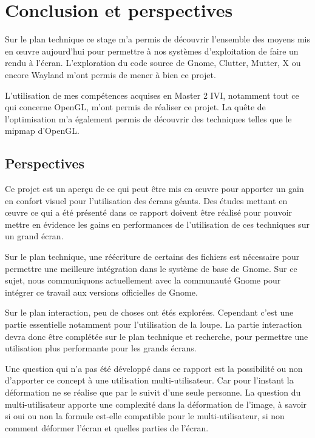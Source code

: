 \chapter{Conclusion et perspectives}

Sur le plan technique ce stage m'a permis de découvrir l'ensemble des moyens mis en œuvre aujourd'hui pour permettre à nos systèmes d'exploitation de faire un rendu à l'écran. L'exploration du code source de Gnome, Clutter, Mutter, X ou encore Wayland m'ont permis de mener à bien ce projet.

L'utilisation de mes compétences acquises en Master 2 IVI, notamment tout ce qui concerne OpenGL, m'ont permis de réaliser ce projet. La quête de l'optimisation m'a également permis de découvrir des techniques telles que le mipmap d'OpenGL.

\section*{Perspectives}

Ce projet est un aperçu de ce qui peut être mis en œuvre pour apporter un gain en confort visuel pour l'utilisation des écrans géants. Des études mettant en œuvre ce qui a été présenté dans ce rapport doivent être réalisé pour pouvoir mettre en évidence les gains en performances de l'utilisation de ces techniques sur un grand écran.

Sur le plan technique, une réécriture de certains des fichiers est nécessaire pour permettre une meilleure intégration dans le système de base de Gnome. Sur ce sujet, nous communiquons actuellement avec la communauté Gnome pour intégrer ce travail aux versions officielles de Gnome. 
	
Sur le plan interaction, peu de choses ont étés explorées. Cependant c'est une partie essentielle notamment pour l'utilisation de la loupe. La partie interaction devra donc être complétée sur le plan technique et recherche, pour permettre une utilisation plus performante pour les grands écrans.

Une question qui n'a pas été développé dans ce rapport est la possibilité ou non d'apporter ce concept à une utilisation multi-utilisateur. Car pour l'instant la déformation ne se réalise que par le suivit d'une seule personne. La question du multi-utilisateur apporte une complexité dans la déformation de l'image, à savoir si oui ou non la formule est-elle compatible pour le multi-utilisateur, si non comment déformer l'écran et quelles parties de l'écran.